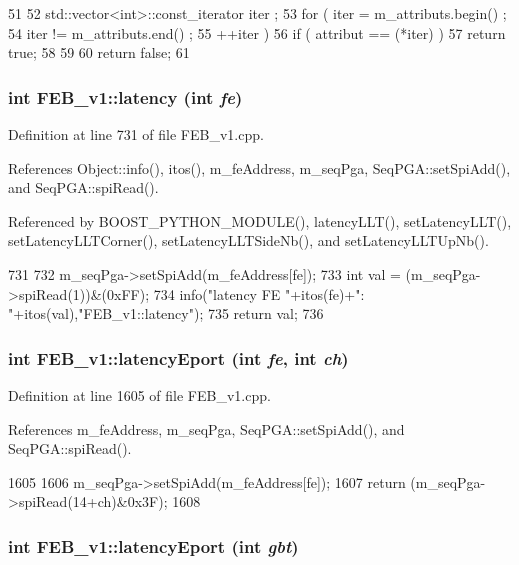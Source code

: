 \begin{DoxyCode}
51   {
52     std::vector<int>::const_iterator iter ;
53     for ( iter  = m_attributs.begin() ;
54           iter != m_attributs.end()   ;
55           ++iter ) {
56       if ( attribut == (*iter) ) {
57         return true;
58       }
59     }
60     return false;
61   }
\end{DoxyCode}
\hypertarget{classFEB__v1_a68050d232efd8d6568910b09a2c18f62}{
\subsubsection[{latency}]{\setlength{\rightskip}{0pt plus 5cm}int FEB\_\-v1::latency (int {\em fe})}}
\label{classFEB__v1_a68050d232efd8d6568910b09a2c18f62}


Definition at line 731 of file FEB\_\-v1.cpp.

References Object::info(), itos(), m\_\-feAddress, m\_\-seqPga, SeqPGA::setSpiAdd(), and SeqPGA::spiRead().

Referenced by BOOST\_\-PYTHON\_\-MODULE(), latencyLLT(), setLatencyLLT(), setLatencyLLTCorner(), setLatencyLLTSideNb(), and setLatencyLLTUpNb().


\begin{DoxyCode}
731                            {
732   m_seqPga->setSpiAdd(m_feAddress[fe]);
733   int val = (m_seqPga->spiRead(1))&(0xFF);
734   info("latency FE "+itos(fe)+": "+itos(val),"FEB_v1::latency");
735   return val;
736 }
\end{DoxyCode}
\hypertarget{classFEB__v1_a8ab1ff429d357779d682bdf28504bdd2}{
\subsubsection[{latencyEport}]{\setlength{\rightskip}{0pt plus 5cm}int FEB\_\-v1::latencyEport (int {\em fe}, \/  int {\em ch})}}
\label{classFEB__v1_a8ab1ff429d357779d682bdf28504bdd2}


Definition at line 1605 of file FEB\_\-v1.cpp.

References m\_\-feAddress, m\_\-seqPga, SeqPGA::setSpiAdd(), and SeqPGA::spiRead().


\begin{DoxyCode}
1605                                        {
1606   m_seqPga->setSpiAdd(m_feAddress[fe]);
1607   return (m_seqPga->spiRead(14+ch)&0x3F);
1608 }
\end{DoxyCode}
\hypertarget{classFEB__v1_a330c0a895c3c43acda2fd68e1cdb7368}{
\subsubsection[{latencyEport}]{\setlength{\rightskip}{0pt plus 5cm}int FEB\_\-v1::latencyEport (int {\em gbt})}}
\label{classFEB__v1_a330c0a895c3c43acda2fd68e1cdb7368}


